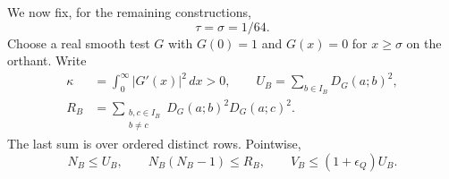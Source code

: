 \documentclass[11pt]{article}
\theoremstyle{remark}
\numberwithin{equation}{section}
\begin{document}
We now fix, for the remaining constructions,
\begin{equation}\label{eq:budgets}
 \tau=\sigma=1/64.
\end{equation}
Choose a real smooth test $G$ with $G(0)=1$ and
$G(x)=0$ for $x\ge\sigma$ on the orthant. Write
\begin{equation}\label{eq:detectors}
 \begin{split}
 \kappa&=\int_0^\infty |G'(x)|^2\,dx>0,\qquad
 U_B=\sum_{b\in I_B}D_G(a;b)^2,\\
 R_B&=\sum_{\substack{b,c\in I_B\\b\ne c}}
             D_G(a;b)^2D_G(a;c)^2 .
 \end{split}
\end{equation}
The last sum is over ordered distinct rows. Pointwise,
\begin{equation}\label{eq:majorants}
 N_B\le U_B,\qquad
 N_B(N_B-1)\le R_B,\qquad
 V_B\le(1+\epsilon_Q)U_B.
\end{equation}
\end{document}
